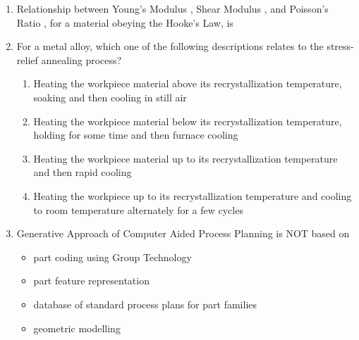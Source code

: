 \documentclass[journal,12pt,onecolumn]{IEEEtran}
\theoremstyle{remark}
\begin{document}
\begin{enumerate}
    \item Relationship between Young's Modulus , Shear Modulus , and Poisson's Ratio \brak{\mu}, for a material obeying the Hooke's Law, is
    
    \hfill{}
    \begin{enumerate}
    \end{enumerate}

    \item For a metal alloy, which one of the following descriptions relates to the stress-relief annealing process?
    
    \hfill{}
    \begin{enumerate}
        \item Heating the workpiece material above its recrystallization temperature, soaking and then cooling in still air
        \item Heating the workpiece material below its recrystallization temperature, holding for some time and then furnace cooling
        \item Heating the workpiece material up to its recrystallization temperature and then rapid cooling
        \item Heating the workpiece up to its recrystallization temperature and cooling to room temperature alternately for a few cycles
    \end{enumerate}

    \item Generative Approach of Computer Aided Process Planning is NOT based on
    \begin{itemize}
        \item[\brak{i}] part coding using Group Technology
        \item[\brak{ii}] part feature representation
        \item[\brak{iii}] database of standard process plans for part families
        \item[\brak{iv}] geometric modelling
    \end{itemize}
    

\end{enumerate}
\end{document}
